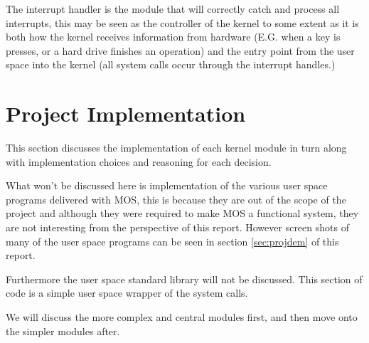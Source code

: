 \documentclass[a4paper]{report}
\begin{document}
The interrupt handler is the module that will correctly catch and process all interrupts, this may be seen as the controller of the kernel to some extent as it is both how the kernel receives information from hardware (E.G. when a key is presses, or a hard drive finishes an operation) and the entry point from the user space into the kernel (all system calls occur through the interrupt handles.)












































\chapter{Project Implementation}

This section discusses the implementation of each kernel module in turn along with implementation choices and reasoning for each decision.

What won't be discussed here is implementation of the various user space programs delivered with MOS, this is because they are out of the scope of the project and although they were required to make MOS a functional system, they are not interesting from the perspective of this report. However screen shots of many of the user space programs can be seen in section \ref{sec:projdem} of this report.

Furthermore the user space standard library will not be discussed. This section of code is a simple user space wrapper of the system calls.

We will discuss the more complex and central modules first, and then move onto the simpler modules after.
\end{document}
